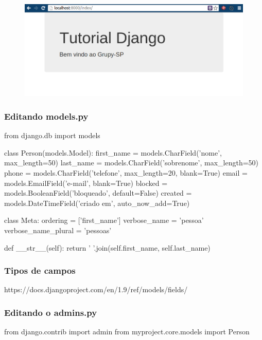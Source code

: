 \documentclass{beamer}
\begin{document}
{\begin{frame}
    \begin{figure}[h]
      \centering
        \includegraphics[width=\paperwidth]{img/index.png}
    \end{figure}

\end{frame}


\begin{frame}[fragile]\frametitle{Editando models.py}

\begin{pythoncode}
from django.db import models

class Person(models.Model):
    first_name = models.CharField('nome', max_length=50)
    last_name = models.CharField('sobrenome', max_length=50)
    phone = models.CharField('telefone', max_length=20, blank=True)
    email = models.EmailField('e-mail', blank=True)
    blocked = models.BooleanField('bloqueado', default=False)
    created = models.DateTimeField('criado em', auto_now_add=True)

    class Meta:
        ordering = ['first_name']
        verbose_name = 'pessoa'
        verbose_name_plural = 'pessoas'

    def __str__(self):
        return ' '.join(self.first_name, self.last_name)
\end{pythoncode}

\end{frame}

\begin{frame}\frametitle{Tipos de campos}
  \begin{center}
    \large https://docs.djangoproject.com/en/1.9/ref/models/fields/
  \end{center}
\end{frame}

\begin{frame}[fragile]\frametitle{Editando o admins.py}

\begin{pythoncode}
from django.contrib import admin
from myproject.core.models import Person


\end{pythoncode}
\end{frame}}
\end{document}
